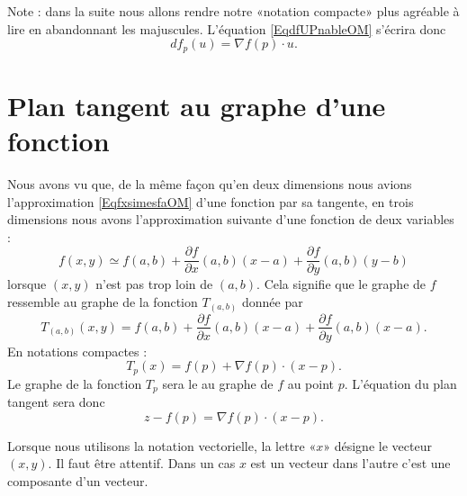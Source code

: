 Note : dans la suite nous allons rendre notre «notation compacte» plus agréable à lire en abandonnant les majuscules. L'équation \eqref{EqdfUPnableOM} s'écrira donc
\begin{equation}        \label{EqdfpunfpduOM}
    df_p(u)=\nabla f(p)\cdot u.
\end{equation}


\section{Plan tangent au graphe d'une fonction}

Nous avons vu que, de la même façon qu'en deux dimensions nous avions l'approximation \eqref{EqfxsimesfaOM} d'une fonction par sa tangente, en trois dimensions nous avons l'approximation suivante d'une fonction de deux variables :
\begin{equation}
    f(x,y)\simeq f(a,b)+\frac{ \partial f }{ \partial x }(a,b)(x-a)+\frac{ \partial f }{ \partial y }(a,b)(y-b)
\end{equation}
lorsque $(x,y)$ n'est pas trop loin de $(a,b)$. Cela signifie que le graphe de $f$ ressemble au graphe de la fonction $T_{(a,b)}$ donnée par
\begin{equation}
    T_{(a,b)}(x,y)=f(a,b)+\frac{ \partial f }{ \partial x }(a,b)(x-a)+\frac{ \partial f }{ \partial y }(a,b)(x-a).
\end{equation}
En notations compactes :
\begin{equation}
    T_p(x)=f(p)+\nabla f(p)\cdot (x-p).
\end{equation}
Le graphe de la fonction $T_p$ sera le  au graphe de $f$ au point $p$. L'équation du plan tangent sera donc
\begin{equation}
    z-f(p)=\nabla f(p)\cdot (x-p).
\end{equation}

\begin{remark}
    Lorsque nous utilisons la notation vectorielle, la lettre «$x$» désigne le vecteur $(x,y)$. Il faut être attentif. Dans un cas $x$ est un vecteur dans l'autre c'est une composante d'un vecteur.
\end{remark}




